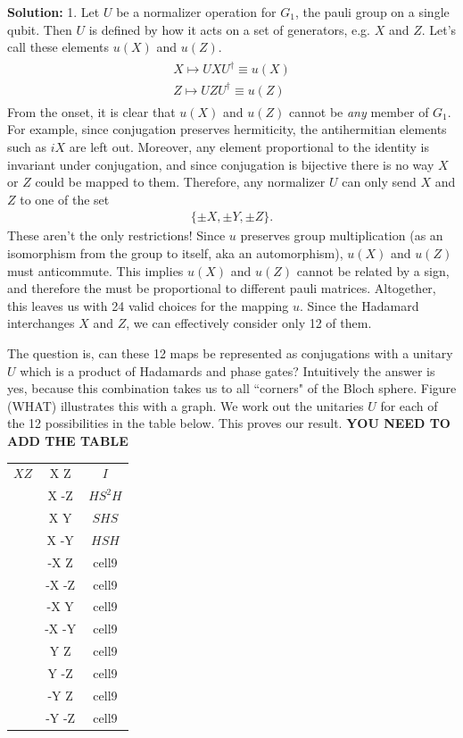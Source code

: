 \documentclass{book}
\begin{document}
    \textbf{Solution:} 1. Let $U$ be a normalizer operation for $G_1$, the pauli group on a single qubit. Then $U$ is defined by how it acts on a set of generators, e.g. $X$ and $Z$. Let's call these elements $u(X)$ and $u(Z)$.
    \begin{align}
    \begin{aligned}
        X \mapsto UXU^\dagger \equiv u(X) \\
        Z \mapsto UZU^\dagger \equiv u(Z)
    \end{aligned}
    \end{align}
    From the onset, it is clear that $u(X)$ and $u(Z)$ cannot be \emph{any} member of $G_1$. For example, since conjugation preserves hermiticity, the antihermitian elements such as $i X$ are left out. Moreover, any element proportional to the identity is invariant under conjugation, and since conjugation is bijective there is no way $X$ or $Z$ could be mapped to them. Therefore, any normalizer $U$ can only send $X$ and $Z$ to one of the set
    \begin{align}
        \{\pm X, \pm Y, \pm Z\}. 
    \end{align}
    These aren't the only restrictions! Since $u$ preserves group multiplication (as an isomorphism from the group to itself, aka an automorphism), $u(X)$ and $u(Z)$ must anticommute. This implies $u(X)$ and $u(Z)$ cannot be related by a sign, and therefore the must be proportional to different pauli matrices. Altogether, this leaves us with 24 valid choices for the mapping $u$. Since the Hadamard interchanges $X$ and $Z$, we can effectively consider only 12 of them. 
    
    The question is, can these 12 maps be represented as conjugations with a unitary $U$ which is a product of Hadamards and phase gates? Intuitively the answer is yes, because this combination takes us to all ``corners" of the Bloch sphere. Figure (WHAT) illustrates this with a graph. We work out the unitaries $U$ for each of the 12 possibilities in the table below. This proves our result. \textbf{YOU NEED TO ADD THE TABLE}
    
    \begin{center}
    \begin{tabular}{ |c|c|c| } 
    \hline
        $X Z$& X Z & $I$ \\ 
        & X -Z & $HS^2H$ \\ 
        & X Y & $SHS$ \\
        & X -Y & $HSH$ \\
        & -X Z & cell9 \\
        & -X -Z & cell9 \\
        & -X Y & cell9 \\
        & -X -Y & cell9 \\
        & Y Z & cell9 \\
        & Y -Z & cell9 \\
        & -Y Z & cell9 \\
        & -Y -Z & cell9 \\
    \hline
    \end{tabular}
    \end{center}
    
\end{document}
